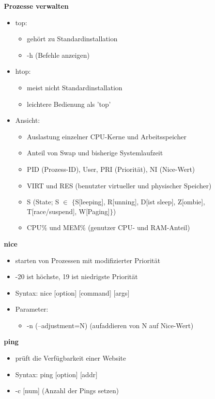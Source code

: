 \documentclass{article}
\begin{document}
\textbf{Prozesse verwalten}
\begin{itemize}
	\item top:
	\begin{itemize}
		\item gehört zu Standardinstallation
		\item -h (Befehle anzeigen)
	\end{itemize}
	\item htop:
	\begin{itemize}
		\item meist nicht Standardinstallation
		\item leichtere Bedienung als 'top'
	\end{itemize}
	\item Ansicht:
	\begin{itemize}
		\item Auslastung einzelner CPU-Kerne und Arbeitsspeicher
		\item Anteil von Swap und bisherige Systemlaufzeit
		\item PID (Prozess-ID), User, PRI (Priorität), NI (Nice-Wert)
		\item VIRT und RES (benutzter virtueller und physischer Speicher)
		\item S (State; S $\in$ $\{$S[leeping], R[unning], D[ist sleep], Z[ombie], T[race/suspend], W[Paging]$\}$)
		\item CPU$\%$ und MEM$\%$ (genutzer CPU- und RAM-Anteil)
	\end{itemize}
\end{itemize}

\textbf{nice}
\begin{itemize}
	\item starten von Prozessen mit modifizierter Priorität
	\item -20 ist höchste, 19 ist niedrigste Priorität
	\item Syntax: nice [option] [command] [args]
	\item Parameter:
	\begin{itemize}
		\item -n (--adjustment=N) (aufaddieren von N auf Nice-Wert)
	\end{itemize}
\end{itemize}

\textbf{ping}
\begin{itemize}
	\item prüft die Verfügbarkeit einer Website
	\item Syntax: ping [option] [addr] 
	\item -c [num] (Anzahl der Pings setzen)
\end{itemize}
\end{document}
